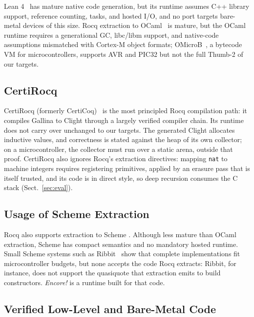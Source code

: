 \documentclass[runningheads]{llncs}
\newcommand{\encore}{\textit{Encore!}}
\newcommand{\code}[1]{\texttt{#1}}
\begin{document}
Lean 4~\cite{demoura2021lean4} has mature native code generation, but its runtime assumes C++ library support, reference counting, tasks, and hosted I/O, and no port targets bare-metal devices of this size.
Rocq extraction to OCaml~\cite{letouzey2008extraction} is mature, but the OCaml runtime requires a generational GC, libc/libm support, and native-code assumptions mismatched with Cortex-M object formats; OMicroB~\cite{OMicroB}, a bytecode VM for microcontrollers, supports AVR and PIC32 but not the full Thumb-2 of our targets.

\subsection{CertiRocq}

CertiRocq (formerly CertiCoq)~\cite{anand2017certicoq} is the most principled Rocq compilation path: it compiles Gallina to Clight through a largely verified compiler chain.
Its runtime does not carry over unchanged to our targets.
The generated Clight allocates inductive values, and correctness is stated against the heap of its own collector; on a microcontroller, the collector must run over a static arena, outside that proof.
CertiRocq also ignores Rocq's extraction directives: mapping \code{nat} to machine integers requires registering primitives, applied by an erasure pass that is itself trusted, and its code is in direct style, so deep recursion consumes the C stack (Sect.~\ref{sec:eval}).

\subsection{Usage of Scheme Extraction}

Rocq also supports extraction to Scheme \cite{letouzey2008extraction}.
Although less mature than OCaml extraction, Scheme has compact semantics and no mandatory hosted runtime.
Small Scheme systems such as Ribbit~\cite{yvon2021ribbit} show that complete implementations fit microcontroller budgets, but none accepts the code Rocq extracts: Ribbit, for instance, does not support the quasiquote that extraction emits to build constructors.
\encore{} is a runtime built for that code.

\subsection{Verified Low-Level and Bare-Metal Code}
\end{document}
